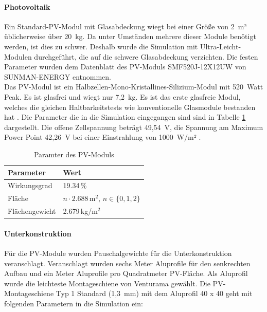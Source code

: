 \paragraph{Photovoltaik}
Ein Standard-PV-Modul mit Glasabdeckung wiegt bei einer Größe von 2~m² üblicherweise über 20~kg. Da unter Umständen mehrere dieser Module benötigt werden, ist dies zu schwer. Deshalb wurde die Simulation mit Ultra-Leicht-Modulen durchgeführt, die auf die schwere Glasabdeckung verzichten.
Die festen Parameter wurden dem Datenblatt des PV-Moduls SMF520J-12X12UW von SUNMAN-ENERGY \cite{Sunman-PVmodule} entnommen. \\

Das PV-Modul ist ein Halbzellen-Mono-Kristallines-Silizium-Modul mit 520~Watt Peak. Es ist glasfrei und wiegt nur 7,2~kg. Es ist das erste glasfreie Modul, welches die gleichen Haltbarkeitstests wie konventionelle Glasmodule bestanden hat \cite{Sunman-PVmodule}. Die Parameter die in die Simulation eingegangen sind sind in Tabelle \ref{tab:pvparam} dargestellt. Die offene Zellspannung beträgt 49,54~V, die Spannung am Maximum Power Point 42,26~V bei einer Einstrahlung von 1000~W/m² \cite{Sunman-PVmodule}. 

\begin{table}[h]
\centering
\begin{tabular}{|l|l|}
\hline
\textbf{Parameter} & \textbf{Wert} \\ \hline
Wirkungsgrad & 19.34\,\% \\ \hline
Fläche & $n \cdot 2.688\,\mathrm{m^2}$, \quad $n \in \{0,1,2\}$ \\ \hline
Flächengewicht & 2.679\,kg/m$^2$ \\ \hline
\end{tabular}
\caption{Paramter des PV-Moduls \cite{Sunman-PVmodule}}
\label{tab:pvparam}
\end{table}



\paragraph{Unterkonstruktion}
Für die PV-Module wurden Pauschalgewichte für die Unterkonstruktion veranschlagt. Veranschlagt wurden sechs Meter Aluprofile für den senkrechten Aufbau und ein Meter Aluprofile pro Quadratmeter PV-Fläche. Als Aluprofil wurde die leichteste Montageschiene von Venturama gewählt. Die PV-Montageschiene Typ 1 Standard (1,3~mm) mit dem Aluprofil 40 x 40 geht mit folgenden Parametern in die Simulation ein: 

